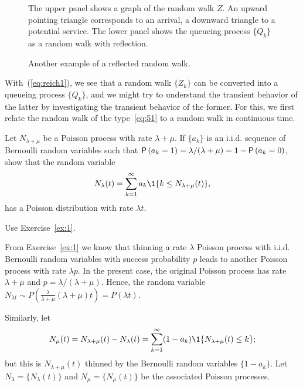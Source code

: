 \begin{figure}[ht]
  \centering

%
\caption{The upper panel shows a graph of the random walk $Z$. An
  upward pointing triangle corresponds to an arrival, a downward
  triangle to a potential service. The lower panel shows the queueing
  process $\{Q_k\}$ as a random walk with reflection.}
\label{fig:random_bernoulli}
\end{figure}

\begin{figure}[ht]
  \centering

\caption{Another example of a reflected random walk.}
\label{fig:random_walk}
\end{figure}


With~(\ref{eq:reich1}),  we see that a random walk $\{Z_k\}$ can be converted into a queueing
process $\{Q_k\}$, and we might try to understand the transient behavior of the latter by investigating the transient behavior of the former.  For this, we first relate the random walk of the type~\eqref{eq:51} to a random walk in continuous time. 

\begin{exercise}
  Let $N_{\lambda+\mu}$ be a Poisson process with rate $\lambda+\mu$. If $\{a_k\}$ is an i.i.d. sequence of Bernoulli random variables such that $\P{a_k=1} = \lambda/(\lambda+\mu)=1-\P{a_k=0}$, show that the random variable
  \begin{equation*}
    N_\lambda(t) = \sum_{k=1}^\infty a_k \1{k \leq N_{\lambda+\mu}(t)},
  \end{equation*}
has a Poisson distribution with rate $\lambda t$. 
\begin{hint}
Use Exercise~\ref{ex:1}.
\end{hint}
\begin{solution}
  From Exercise~\ref{ex:1} we know that thinning  a rate $\lambda$ Poisson process  with i.i.d. Bernoulli random variables with success probability $p$  leads to another Poisson process with rate $\lambda p$. In the present case, the original Poisson process has rate $\lambda+\mu$ and $p=\lambda/(\lambda+\mu)$. Hence, the random variable $N_{\lambda t}\sim P\left(\frac\lambda{\lambda+\mu} (\lambda+\mu)t\right) = P(\lambda t)$.
\end{solution}
\end{exercise}

Similarly, let
\begin{equation*}
  N_\mu(t) = N_{\lambda+\mu}(t) - N_\lambda(t) = \sum_{k=1}^\infty (1-a_k) \1{N_{\lambda+\mu}(t) \leq k};
\end{equation*}
but this is $N_{\lambda+\mu}(t)$ thinned by the Bernoulli random variables $\{1-a_k\}$. Let  $N_\lambda = \{N_\lambda(t)\}$ and $N_\mu = \{N_\mu(t)\}$  be the associated Poisson processes. 

